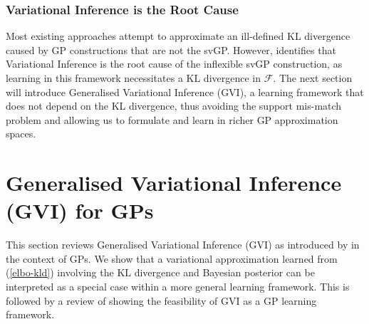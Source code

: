 \documentclass{article}
\numberwithin{equation}{section}
\begin{document}
\subsubsection{Variational Inference is the Root Cause}
Most existing approaches attempt to approximate an ill-defined KL divergence caused by GP constructions that are not the svGP. However, \cite{wild2022generalized} identifies that Variational Inference is the root cause of the inflexible svGP construction, as learning in this framework necessitates a KL divergence in $\mathcal{F}$. The next section will introduce Generalised Variational Inference (GVI), a learning framework that does not depend on the KL divergence, thus avoiding the support mis-match problem and allowing us to formulate and learn in richer GP approximation spaces.

\newpage
\section{Generalised Variational Inference (GVI) for GPs}
This section reviews Generalised Variational Inference (GVI) as introduced by \cite{knoblauch2022optimization} in the context of GPs. We show that a variational approximation learned from (\ref{elbo-kld}) involving the KL divergence and Bayesian posterior can be interpreted as a special case within a more general learning framework. This is followed by a review of \cite{wild2022generalized} showing the feasibility of GVI as a GP learning framework.
\end{document}
